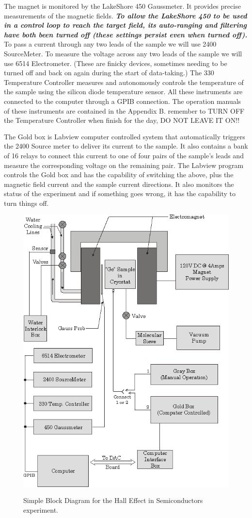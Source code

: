\documentclass{../lab}
\begin{document}
The magnet is monitored by the LakeShore 450 Gaussmeter. It provides precise measurements of the magnetic fields. \emph{\textbf{To allow the LakeShore 450 to be used in a control loop to reach the target field, its auto-ranging and filtering have both been turned off (these settings persist even when turned off).}} To pass a current through any two leads of the sample we will use 2400 SourceMeter. To measure the voltage across any two leads of the sample we will use 6514 Electrometer. (These are finicky devices, sometimes needing to be turned off and back on again during the start of data-taking.) The 330 Temperature Controller measures and autonomously controls the temperature of the sample using the silicon diode temperature sensor. All these instruments are connected to the computer through a GPIB connection. The operation manuals of these instruments are contained in the Appendix B. {remember to TURN OFF the Temperature Controller when finish for the day, DO NOT LEAVE IT ON!!}

The Gold box is Labview computer controlled system that automatically triggers the 2400 Source meter to deliver its current to the sample. It also contains a bank of 16 relays to connect this current to one of four pairs of the sample's leads and measure the corresponding voltage on the remaining pair. The Labview program controls the Gold box and has the capability of switching the above, plus the magnetic field current and the sample current directions. It also monitors the status of the experiment and if something goes wrong, it has the capability to turn things off.


\begin{figure}[h]
    \centering
    \href{http://experimentationlab.berkeley.edu/sites/default/files/images/SHEimage101.gif}{\includegraphics[width=0.7\linewidth]{images/SHEimage101.png}}
    \caption{Simple Block Diagram for the Hall Effect in Semiconductors experiment.}
    \label{fig:SimpleBlockDiagram}
\end{figure}
\end{document}
